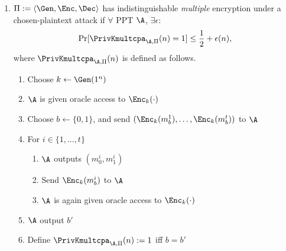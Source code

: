 \begin{solution}
\begin{enumerate}
    \item
      $\Pi := \langle\Gen, \Enc, \Dec\rangle$ has indistinguishable \emph{multiple} encryption under a chosen-plaintext attack
      if $\forall$ PPT $\A$, $\exists \epsilon$:
      \[ \Pr[\PrivKmultcpa_{\A,\Pi}(n) = 1] \leq \frac{1}{2} + \epsilon(n), \]
      where $\PrivKmultcpa_{\A,\Pi}(n)$ is defined as follows.
      \begin{enumerate}
        \item Choose $k \leftarrow \Gen(1^n)$
        \item $\A$ is given oracle access to $\Enc_k(\cdot)$
        \item Choose $b \leftarrow \{0,1\}$, and send $(\Enc_k(m_b^1), \ldots, \Enc_k(m_b^t))$ to $\A$
        \item For $i \in \{1, \ldots, t\}$
          \begin{enumerate}
            \item $\A$ outputs $(m_0^i, m_1^i)$
            \item Send $\Enc_k(m_b^i)$ to $\A$
            \item $\A$ is again given oracle access to $\Enc_k(\cdot)$
          \end{enumerate}
        \item $\A$ output $b'$
        \item Define $\PrivKmultcpa_{\A,\Pi}(n) := 1$ iff $b = b'$
      \end{enumerate}
  \end{enumerate}
\end{solution}

